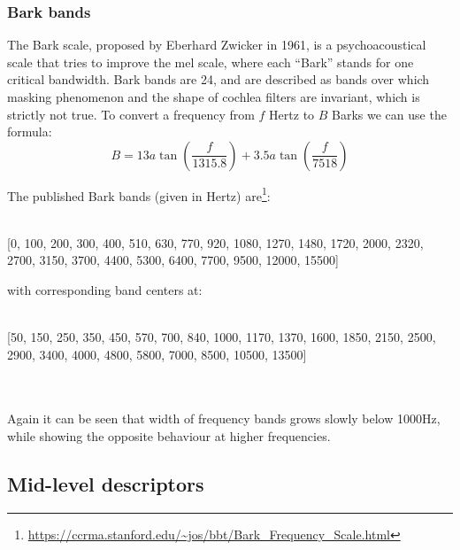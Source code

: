 \subsubsection{Bark bands}
The Bark scale, proposed by Eberhard Zwicker in 1961, is a psychoacoustical scale that tries to improve the mel scale, where each ``Bark'' stands for one critical bandwidth. Bark bands are 24, and are described as bands over which masking phenomenon and the shape of cochlea filters are invariant, which is strictly not true. To convert a frequency from $f$ Hertz to $B$ Barks we can use the formula:
\begin{equation}
B = 13a\tan \left(\frac{f}{1315.8} \right) + 3.5a\tan \left( \frac{f}{7518} \right)
\end{equation}

The published Bark bands (given in Hertz) are\footnote{\url{https://ccrma.stanford.edu/~jos/bbt/Bark_Frequency_Scale.html}}:\\ \\
\hfill\begin{minipage}{\dimexpr\textwidth-1.5cm}
[0, 100, 200, 300, 400, 510, 630, 770, 920, 1080, 1270, 1480, 1720, 2000, 2320, 2700, 3150, 3700, 4400, 5300, 6400, 7700, 9500, 12000, 15500]
\xdef\tpd{\the\prevdepth}
\end{minipage}

with corresponding band centers at:\\ \\
\hfill\begin{minipage}{\dimexpr\textwidth-1.5cm}
[50, 150, 250, 350, 450, 570, 700, 840, 1000, 1170, 1370, 1600, 1850, 2150, 2500, 2900, 3400, 4000, 4800, 5800, 7000, 8500, 10500, 13500]
\xdef\tpd{\the\prevdepth}
\end{minipage}
\\ \\
Again it can be seen that width of frequency bands grows slowly below 1000Hz, while showing the opposite behaviour at higher frequencies. 

\subsection{Mid-level descriptors}
